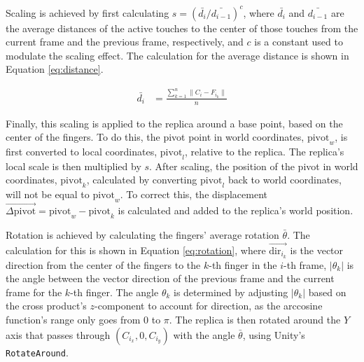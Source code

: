     Scaling is achieved by first calculating $s = {{\left(\bar{d_i} / \bar{d_{i-1}}\right)}^{c}}$, where \(\bar{d_i}\) and \(\bar{d_{i-1}}\) are the average distances of the active touches to the center of those touches from the current frame and the previous frame, respectively, and \(c\) is a constant used to modulate the scaling effect. The calculation for the average distance is shown in Equation \ref{eq:distance}.
    
    \begin{figure}[h]
    \begin{equation}
    \begin{split} \label{eq:distance}
        \bar{d_i} &= \frac{\sum_{k = 1}^{n} \| C_i - F_{i_k} \|}{n}
    \end{split}
    \end{equation}
    \end{figure}
    
    Finally, this scaling is applied to the replica around a base point, based on the center of the fingers. To do this, the pivot point in world coordinates, \(\mathrm{pivot}_w\), is first converted to local coordinates, \(\mathrm{pivot}_l\), relative to the replica. The replica's local scale is then multiplied by \(s\). After scaling, the position of the pivot in world coordinates, \(\mathrm{pivot}_k\), calculated by converting \(\mathrm{pivot}_l\) back to world coordinates, will not be equal to \(\mathrm{pivot}_w\). To correct this, the displacement \(\vec{\Delta \mathrm{pivot}} = \mathrm{pivot}_w - \mathrm{pivot}_k\) is calculated and added to the replica's world position.

    Rotation is achieved by calculating the fingers' average rotation \(\bar{\theta}\). The calculation for this is shown in Equation \ref{eq:rotation}, where \(\vec{\mathrm{dir}_{i_k}}\) is the vector direction from the center of the fingers to the \(k\)-th finger in the \(i\)-th frame, \(|\theta_k|\) is the angle between the vector direction of the previous frame and the current frame for the \(k\)-th finger. The angle \(\theta_k\) is determined by adjusting \(|\theta_k|\) based on the cross product's \(z\)-component to account for direction, as the arccosine function's range only goes from \(0\) to \(\pi\). The replica is then rotated around the \(Y\) axis that passes through \((C_{i_x}, 0, C_{i_y})\) with the angle $\bar{\theta}$, using Unity's \lstinline{RotateAround}.

